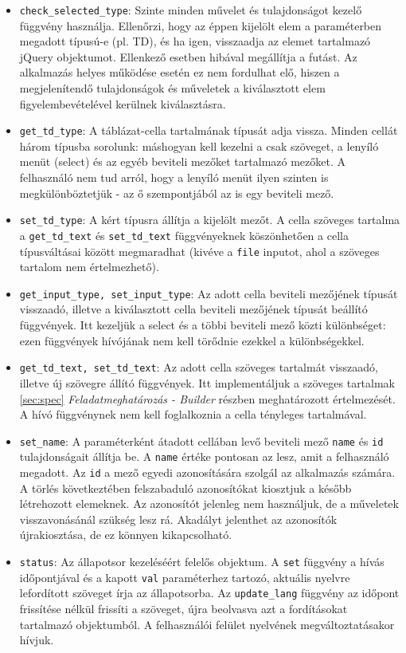 \documentclass[12pt,a4paper,twoside]{article}
\newcommand{\fitem}[1]{\item \texttt{#1}:}
\begin{document}
\begin{itemize}
\fitem{check\_selected\_type}
Szinte minden művelet és tulajdonságot kezelő
függvény használja. Ellenőrzi, hogy az éppen kijelölt elem a paraméterben
megadott típusú-e (pl. TD), és ha igen, visszaadja az elemet tartalmazó jQuery
objektumot. Ellenkező esetben hibával megállítja a futást. Az alkalmazás
helyes működése esetén ez nem fordulhat elő, hiszen a megjelenítendő
tulajdonságok és műveletek a kiválasztott elem figyelembevételével kerülnek
kiválasztásra.

\fitem{get\_td\_type}
A táblázat-cella tartalmának típusát adja vissza. Minden cellát három típusba
sorolunk: máshogyan kell kezelni a csak szöveget, a lenyíló menüt
(select) és az egyéb beviteli mezőket tartalmazó mezőket. A felhasználó nem
tud arról, hogy a lenyíló menüt ilyen szinten is megkülönböztetjük - az ő
szempontjából az is egy beviteli mező.

\fitem{set\_td\_type}
A kért típusra állítja a kijelölt mezőt. A cella szöveges tartalma a
\texttt{get\_td\_text} és \texttt{set\_td\_text} függvényeknek köszönhetően a cella
típusváltásai között megmaradhat (kivéve a \texttt{file} inputot, ahol a
szöveges tartalom nem értelmezhető).

\fitem{get\_input\_type, set\_input\_type}
Az adott cella beviteli mezőjének típusát visszaadó, illetve a kiválasztott
cella beviteli mezőjének típusát beállító függvények. Itt kezeljük a select és a
többi beviteli mező közti különbséget: ezen függvények hívójának nem kell
törődnie ezekkel a különbségekkel.

\fitem{get\_td\_text, set\_td\_text}
Az adott cella szöveges tartalmát visszaadó, illetve új szövegre állító
függvények. Itt implementáljuk a szöveges tartalmak \ref{sec:spec}
\textit{Feladatmeghatározás - Builder} részben meghatározott értelmezését. A hívó
függvénynek nem kell foglalkoznia a cella tényleges tartalmával.

\fitem{set\_name}
A paraméterként átadott cellában levő beviteli mező \texttt{name} és \texttt{id}
tulajdonságait állítja be. A \texttt{name} értéke pontosan az lesz, amit a
felhasználó megadott. Az \texttt{id} a mező egyedi azonosítására szolgál az
alkalmazás számára. A törlés következtében felszabaduló azonosítókat kiosztjuk
a később létrehozott elemeknek. Az azonosítót jelenleg nem használjuk, de a
műveletek visszavonásánál szükség lesz rá. Akadályt jelenthet az azonosítók
újrakiosztása, de ez könnyen kikapcsolható.

\fitem{status}
Az állapotsor kezeléséért felelős objektum. A \texttt{set} függvény a hívás
időpontjával és a kapott \texttt{val} paraméterhez tartozó, aktuális nyelvre
lefordított szöveget írja az állapotsorba. Az \texttt{update\_lang} függvény az
időpont frissítése nélkül frissíti a szöveget, újra beolvasva azt a fordításokat
tartalmazó objektumból. A felhasználói felület nyelvének megváltoztatásakor
hívjuk.
\end{itemize}
\end{document}
